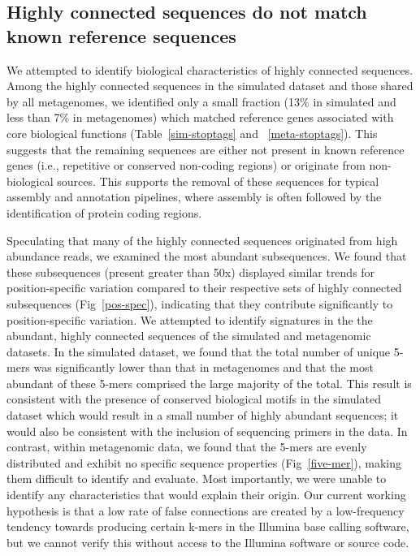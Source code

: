 \documentclass[10pt]{article}
\begin{document}
\subsection*{Highly connected sequences do not match known reference sequences}

We attempted to identify biological characteristics of highly
connected sequences.  Among the highly connected sequences in the
simulated dataset and those shared by all metagenomes, we identified
only a small fraction (13\% in simulated and less than 7\% in
metagenomes) which matched reference genes associated with core
biological functions (Table~\ref{sim-stoptags} and ~\ref{meta-stoptags}).  This suggests that the
remaining sequences are either not present in known reference genes
(i.e., repetitive or conserved non-coding regions) or originate from non-biological
sources.  This supports the removal of these sequences for typical
assembly and annotation pipelines, where assembly is often followed by
the identification of protein coding regions.

Speculating that many of the highly connected sequences originated
from high abundance reads, we examined the most abundant subsequences.
We found that these subsequences (present greater than 50x) displayed
similar trends for position-specific variation compared to their
respective sets of highly connected subsequences (Fig~\ref{pos-spec}),
indicating that they contribute significantly to position-specific
variation.  We attempted to identify signatures in the the abundant,
highly connected sequences of the simulated and metagenomic datasets.
In the simulated dataset, we found that the total number of unique
5-mers was significantly lower than that in metagenomes and that the
most abundant of these 5-mers comprised the large majority of the
total.  This result is consistent with the presence of conserved
biological motifs in the simulated dataset which would result in a
small number of highly abundant sequences; it would also be consistent
with the inclusion of sequencing primers in the data.  In contrast, within
metagenomic data, we found that the 5-mers are evenly distributed and
exhibit no specific sequence properties (Fig~\ref{five-mer}), making them
difficult to identify and evaluate.  Most importantly, we were unable
to identify any characteristics that would explain their origin.  Our
current working hypothesis is that a low rate of false connections are
created by a low-frequency tendency towards producing certain k-mers
in the Illumina base calling software, but we cannot verify this
without access to the Illumina software or source code.
\end{document}
